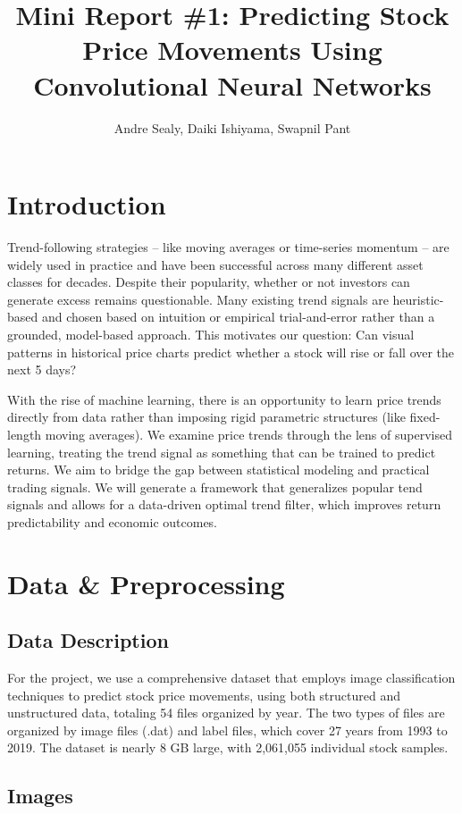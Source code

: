 \documentclass[12pt]{article}
\title{Mini Report \#1: Predicting Stock Price Movements Using Convolutional Neural Networks}
\author{Andre Sealy, Daiki Ishiyama, Swapnil Pant}
\begin{document}
	
\maketitle

\section*{Introduction}

Trend-following strategies -- like moving averages or time-series momentum -- are widely used in practice and have been successful across many different asset classes for decades. Despite their popularity, whether or not investors can generate excess remains questionable. Many existing trend signals are heuristic-based and chosen based on intuition or empirical trial-and-error rather than a grounded, model-based approach. This motivates our question:  Can visual patterns in historical price charts predict whether a stock will rise or fall over the next 5 days?

With the rise of machine learning, there is an opportunity to learn price trends directly from data rather than imposing rigid parametric structures (like fixed-length moving averages). We examine price trends through the lens of supervised learning, treating the trend signal as something that can be trained to predict returns. We aim to bridge the gap between statistical modeling and practical trading signals. We will generate a framework that generalizes popular tend signals and allows for a data-driven optimal trend filter, which improves return predictability and economic outcomes.

\section*{Data \& Preprocessing}
\subsection*{Data Description}

For the project, we use a comprehensive dataset that employs image classification techniques to predict stock price movements, using both structured and unstructured data, totaling 54 files organized by year. The two types of files are organized by image files (.dat) and label files, which cover 27 years from 1993 to 2019. The dataset is nearly 8 GB large, with 2,061,055 individual stock samples.

\subsection*{Images}
\end{document}
